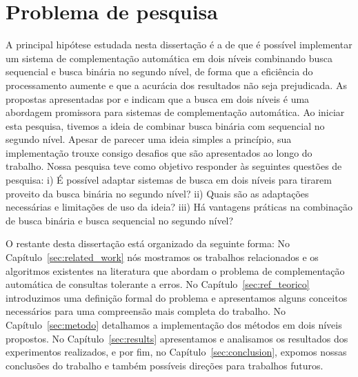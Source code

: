 \section{Problema de pesquisa}
\label{sec:research-problem}
A principal hipótese estudada nesta dissertação é a de que é possível implementar um sistema de complementação automática em dois níveis combinando busca sequencial e busca binária no segundo nível, de forma que a eficiência do processamento aumente e que a acurácia dos resultados não seja prejudicada. As propostas apresentadas por \cite{xavier2019} e \cite{berg2020} indicam que a busca em dois níveis é uma abordagem promissora para sistemas de complementação automática. Ao iniciar esta pesquisa, tivemos a ideia de combinar busca binária com sequencial no segundo nível. Apesar de parecer uma ideia simples a princípio, sua implementação trouxe consigo desafios que são apresentados ao longo do trabalho. Nossa pesquisa teve como objetivo responder às seguintes questões de pesquisa: i) É possível adaptar sistemas de busca em dois níveis para tirarem proveito da busca binária no segundo nível? ii) Quais são as adaptações necessárias e limitações de uso da ideia? iii) Há vantagens práticas na combinação de busca binária e busca sequencial no segundo nível?


O restante desta dissertação está organizado da seguinte forma: No Capítulo~\ref{sec:related_work} nós mostramos os trabalhos relacionados e os algoritmos existentes na literatura que abordam o problema de complementação automática de consultas tolerante a erros. No Capítulo~\ref{sec:ref_teorico} introduzimos uma definição formal do problema e apresentamos alguns conceitos necessários para uma compreensão mais completa do trabalho. No Capítulo~\ref{sec:metodo} detalhamos a implementação dos métodos em dois níveis propostos. No Capítulo~\ref{sec:results} apresentamos e analisamos os resultados dos experimentos realizados, e por fim, no Capítulo~\ref{sec:conclusion}, expomos nossas conclusões do trabalho e também possíveis direções para trabalhos futuros.
